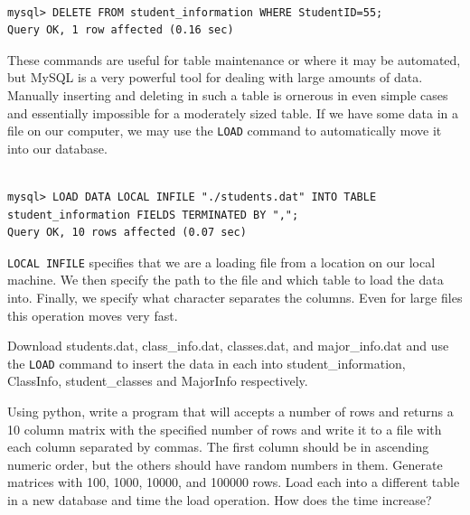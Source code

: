 \begin{lstlisting}

mysql> DELETE FROM student_information WHERE StudentID=55;
Query OK, 1 row affected (0.16 sec)

\end{lstlisting}

These commands are useful for table maintenance or where it may be automated, but MySQL is a very powerful tool for dealing with large amounts of data.  Manually inserting and deleting in such a table is ornerous in even simple cases and essentially impossible for a moderately sized table.  If we have some data in a file on our computer, we may use the {\tt LOAD} command to automatically move it into our database.

\begin{lstlisting}

mysql> LOAD DATA LOCAL INFILE "./students.dat" INTO TABLE student_information FIELDS TERMINATED BY ",";
Query OK, 10 rows affected (0.07 sec)

\end{lstlisting}

{\tt LOCAL INFILE} specifies that we are a loading file from a location on our local machine.  We then specify the path to the file and which table to load the data into.  Finally, we specify what character separates the columns.  Even for large files this operation moves very fast.

\begin{problem}

Download students.dat, class\_info.dat, classes.dat, and major\_info.dat and use the {\tt LOAD} command to insert the data in each into student\_information, ClassInfo, student\_classes and MajorInfo respectively.

\end{problem}

\begin{problem}

Using python, write a program that will accepts a number of rows and returns a 10 column matrix with the specified number of rows and write it to a file with each column separated by commas.  The first column should be in ascending numeric order, but the others should have random numbers in them.  Generate matrices with 100, 1000, 10000, and 100000 rows.  Load each into a different table in a new database and time the load operation.  How does the time increase?

\end{problem}

